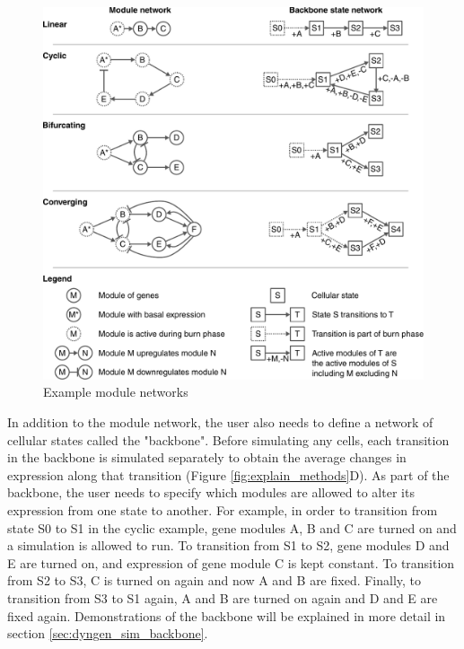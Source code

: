 \begin{figure}[htb!]
	\centering
	\includegraphics[width=\LARGEfigure]{fig/example_backbones} 
	\caption{Example module networks}
	\label{fig:example_backbones}
\end{figure}

In addition to the module network, the user also needs to define a network of cellular states called the "backbone". Before simulating any cells, each transition in the backbone is simulated separately to obtain the average changes in expression along that transition (Figure \ref{fig:explain_methods}D). As part of the backbone, the user needs to specify which modules are allowed to alter its expression from one state to another. For example, in order to transition from state S0 to S1 in the cyclic example, gene modules A, B and C are turned on and a simulation is allowed to run. To transition from S1 to S2, gene modules D and E are turned on, and expression of gene module C is kept constant. To transition from S2 to S3, C is turned on again and now A and B are fixed. Finally, to transition from S3 to S1 again, A and B are turned on again and D and E are fixed again. Demonstrations of the backbone will be explained in more detail in section \ref{sec:dyngen_sim_backbone}.

